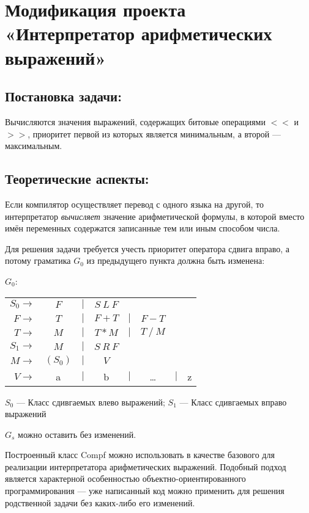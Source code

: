 \section{Модификация проекта «Интерпретатор арифметических выражений»}

\subsection{Постановка задачи:}
Вычисляются значения выражений, содержащих битовые операциями  $<<$ и $>>$,
приоритет первой из которых является минимальным, а второй — максимальным.

\subsection{Теоретические аспекты:}
Если компилятор осуществляет перевод с одного языка на другой, то интерпретатор
\emph{вычисляет} значение арифметической формулы, в которой вместо имён переменных
содержатся записанные тем или иным способом числа.

Для решения задачи требуется учесть приоритет оператора сдвига вправо, а потому
граматика $G_0$ из предыдущего пункта должна быть изменена:

$G_0$:
\medskip
\noindent\hspace{2cm}
\begin{tabular}{rcccccll}
$S_0 \rightarrow$ & $F $&$\mid$&$ S~L~F$\\
$F \rightarrow$ & $T $&$\mid$&$ F+T$&$\mid$&$ F-T$\\
$T \rightarrow$ & $M $&$\mid$&$ T*M$&$\mid$&$ T~/~M$\\
$S_1 \rightarrow$ & $M $&$\mid$&$ S~R~F$\\
$M \rightarrow$ & $(S_0)$&$\mid$&$ V$\\
$V \rightarrow$ & a &$\mid$& b &$\mid$& \dots &$\mid$& z\\
\end{tabular}
\medskip

$S_0$ --- Класс сдивгаемых влево выражений;
$S_1$ --- Класс сдивгаемых вправо выражений

$G_s$ можно оставить без изменений.

Построенный класс Compf можно использовать в качестве базового для реализации
интерпретатора арифметических выражений. Подобный подход является характерной
особенностью объектно-ориентированного программирования — уже написанный код можно
применить для решения родственной задачи без каких-либо его изменений.

